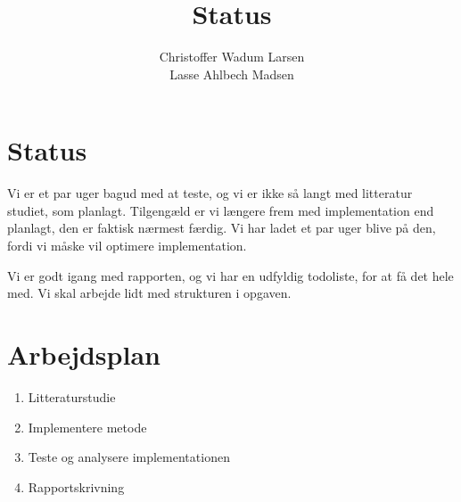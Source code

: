 \documentclass[12pt]{article}
\title{Status}
\author{
Christoffer Wadum Larsen\\
Lasse Ahlbech Madsen}
\begin{document}
\maketitle


\section{Status}

Vi er et par uger bagud med at teste, og vi er ikke så langt med litteratur studiet, som planlagt. Tilgengæld er vi længere frem med implementation end planlagt, den er faktisk nærmest færdig. Vi har ladet et par uger blive på den, fordi vi måske vil optimere implementation.

Vi er godt igang med rapporten, og vi har en udfyldig todoliste, for at få det hele med. Vi skal arbejde lidt med strukturen i opgaven.

\section*{Arbejdsplan}
\begin{enumerate}
    \item Litteraturstudie 
    \item Implementere metode
    \item Teste og analysere implementationen
    \item Rapportskrivning
\end{enumerate}

\begin{gantt}{5}{16}
    \begin{ganttitle}
    \end{ganttitle}
\end{gantt}
\end{document}
